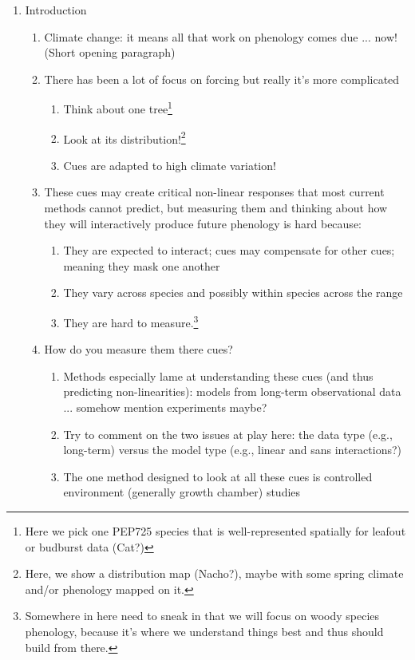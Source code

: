 \documentclass[11pt,letterpaper]{article}
\begin{document}
\begin{enumerate}
\item Introduction 
\begin{enumerate}
\item Climate change: it means all that work on phenology comes due ... now! (Short opening paragraph)
\item There has been a lot of focus on forcing but really it's more complicated
\begin{enumerate}
\item Think about one tree\footnote{Here we pick one PEP725 species that is well-represented spatially for leafout or budburst data (Cat?)}
\item Look at its distribution!\footnote{Here, we show a distribution map (Nacho?), maybe with some spring climate and/or phenology mapped on it.}
\item Cues are adapted to high climate variation!
\end{enumerate}
\item These cues may create critical non-linear responses that most current methods cannot predict, but measuring them and thinking about how they will interactively produce future phenology is hard because:
\begin{enumerate}
\item They are expected to interact; cues may compensate for other cues; meaning they mask one another
\item They vary across species and possibly within species across the range
\item They are hard to measure.\footnote{Somewhere in here need to sneak in that we will focus on woody species phenology, because it's where we understand things best and thus should build from there.}
\end{enumerate}
\item How do you measure them there cues?
\begin{enumerate}
\item Methods especially lame at understanding these cues (and thus predicting non-linearities): models from long-term observational data ... somehow mention experiments maybe?
\item Try to comment on the two issues at play here: the data type (e.g., long-term) versus the model type (e.g., linear and sans interactions?)
\item The one method designed to look at all these cues is controlled environment (generally growth chamber) studies

\end{enumerate}
\end{enumerate}
\end{enumerate}
\end{document}
